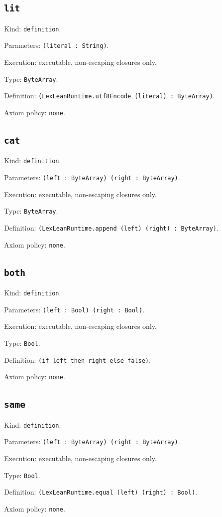 \documentclass[11pt]{article}
\begin{document}
\subsection*{\texttt{lit}}
\noindent Kind: \texttt{definition}.\par
\noindent Parameters: \texttt{(literal : String)}.\par
\noindent Execution: executable, non-escaping closures only.\par
\noindent Type: \texttt{ByteArray}.\par
\noindent Definition: \texttt{(LexLeanRuntime.utf8Encode (literal) : ByteArray)}.\par
\noindent Axiom policy: \texttt{none}.\par
\subsection*{\texttt{cat}}
\noindent Kind: \texttt{definition}.\par
\noindent Parameters: \texttt{(left : ByteArray) (right : ByteArray)}.\par
\noindent Execution: executable, non-escaping closures only.\par
\noindent Type: \texttt{ByteArray}.\par
\noindent Definition: \texttt{(LexLeanRuntime.append (left) (right) : ByteArray)}.\par
\noindent Axiom policy: \texttt{none}.\par
\subsection*{\texttt{both}}
\noindent Kind: \texttt{definition}.\par
\noindent Parameters: \texttt{(left : Bool) (right : Bool)}.\par
\noindent Execution: executable, non-escaping closures only.\par
\noindent Type: \texttt{Bool}.\par
\noindent Definition: \texttt{(if left then right else false)}.\par
\noindent Axiom policy: \texttt{none}.\par
\subsection*{\texttt{same}}
\noindent Kind: \texttt{definition}.\par
\noindent Parameters: \texttt{(left : ByteArray) (right : ByteArray)}.\par
\noindent Execution: executable, non-escaping closures only.\par
\noindent Type: \texttt{Bool}.\par
\noindent Definition: \texttt{(LexLeanRuntime.equal (left) (right) : Bool)}.\par
\noindent Axiom policy: \texttt{none}.\par
\end{document}
